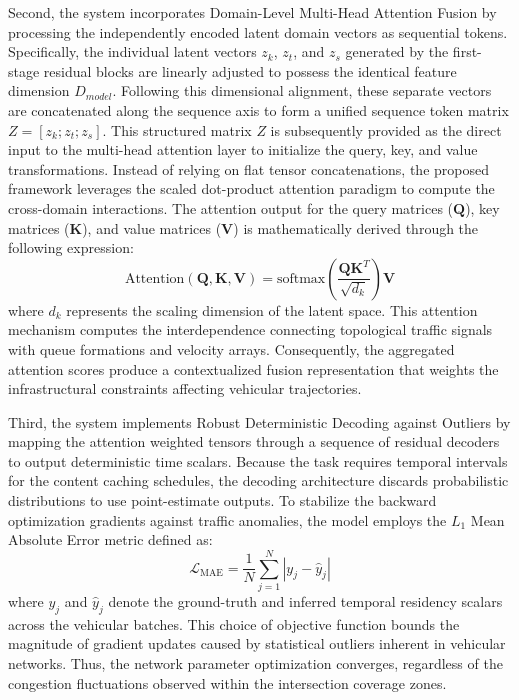 \documentclass[journal]{IEEEtran}
\begin{document}
Second, the system incorporates Domain-Level Multi-Head Attention Fusion by processing the independently encoded latent domain vectors as sequential tokens.
Specifically, the individual latent vectors $z_k$, $z_t$, and $z_s$ generated by the first-stage residual blocks are linearly adjusted to possess the identical feature dimension $D_{model}$.
Following this dimensional alignment, these separate vectors are concatenated along the sequence axis to form a unified sequence token matrix $Z = [z_k; z_t; z_s]$.
This structured matrix $Z$ is subsequently provided as the direct input to the multi-head attention layer to initialize the query, key, and value transformations.
Instead of relying on flat tensor concatenations, the proposed framework leverages the scaled dot-product attention paradigm to compute the cross-domain interactions.
The attention output for the query matrices ($\mathbf{Q}$), key matrices ($\mathbf{K}$), and value matrices ($\mathbf{V}$) is mathematically derived through the following expression:
\begin{equation}
\text{Attention}(\mathbf{Q}, \mathbf{K}, \mathbf{V}) = \text{softmax}\left(\frac{\mathbf{Q}\mathbf{K}^T}{\sqrt{d_k}}\right)\mathbf{V}
\end{equation}
where $d_k$ represents the scaling dimension of the latent space.
This attention mechanism computes the interdependence connecting topological traffic signals with queue formations and velocity arrays.
Consequently, the aggregated attention scores produce a contextualized fusion representation that weights the infrastructural constraints affecting vehicular trajectories.

Third, the system implements Robust Deterministic Decoding against Outliers by mapping the attention weighted tensors through a sequence of residual decoders to output deterministic time scalars.
Because the task requires temporal intervals for the content caching schedules, the decoding architecture discards probabilistic distributions to use point-estimate outputs.
To stabilize the backward optimization gradients against traffic anomalies, the model employs the $L_1$ Mean Absolute Error metric defined as:
\begin{equation}
\mathcal{L}_{\text{MAE}} = \frac{1}{N} \sum_{j=1}^{N} \left| y_j - \hat{y}_j \right|
\end{equation}
where $y_j$ and $\hat{y}_j$ denote the ground-truth and inferred temporal residency scalars across the vehicular batches.
This choice of objective function bounds the magnitude of gradient updates caused by statistical outliers inherent in vehicular networks.
Thus, the network parameter optimization converges, regardless of the congestion fluctuations observed within the intersection coverage zones.
\end{document}
